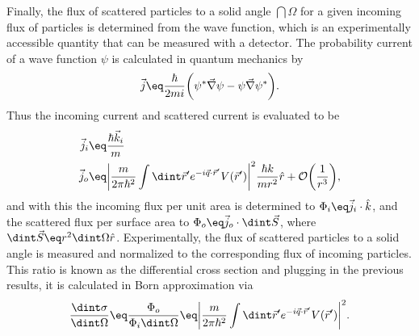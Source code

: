 \documentclass[\main/dresen_thesis.tex]{subfiles}
\begin{document}
    Finally, the flux of scattered particles to a solid angle $\dint \Omega$ for a given incoming flux of particles is determined from the wave function, which is an experimentally accessible quantity that can be measured with a detector.
    The probability current of a wave function $\psi$  is calculated in quantum mechanics by
    \begin{align}
      \vec{j} \eq \frac{\hbar}{2mi} \bigg( \psi^* \vec{\nabla} \psi - \psi \vec{\nabla} \psi^* \bigg).
    \end{align}
    Thus the incoming current and scattered current is evaluated to be
    \begin{align}
      \vec{j}_i &\eq \frac{\hbar \vec{k}_i}{m}\\
      \vec{j}_o &\eq \bigg| \frac{m}{2 \pi\hbar^2} \int \dint \vec{r}^\prime e^{-i\vec{q} \cdot \vec{r}^\prime} V (\vec{r}^\prime) \bigg|^2 \frac{\hbar k}{m r^2} \hat{r} + \mathcal{O} \bigg(\frac{1}{r^3}\bigg),\\
    \end{align}
    and with this the incoming flux per unit area is determined to $\Phi_i \eq \vec{j}_i \cdot \hat{k}$, and the scattered flux per surface area to $\Phi_o \eq \vec{j}_o \cdot \dint \vec{S}$, where $\dint \vec{S} \eq r^2 \dint \Omega \hat{r}$.
    Experimentally, the flux of scattered particles to a solid angle is measured and normalized to the corresponding flux of incoming particles. This ratio is known as the differential cross section and plugging in the previous results, it is calculated in Born approximation via
    \begin{align}
      \frac{\dint \sigma}{\dint \Omega} \eq \frac{\Phi_o}{\Phi_i \dint \Omega} \eq \bigg| \frac{m}{2 \pi\hbar^2} \int \dint \vec{r}^\prime e^{-i\vec{q} \cdot \vec{r}^\prime} V (\vec{r}^\prime) \bigg|^2.\label{eq:theoreticalBackground:scattering:scatteringTheory:differentialCrossSectionIntegralOverPotential}
    \end{align}
\end{document}
